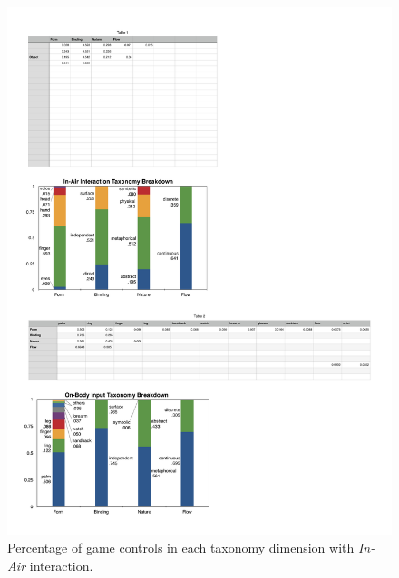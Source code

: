 \documentclass{sigchi}
\begin{document}
 \begin{figure}[!h]
  \centering
  \includegraphics[width=1\columnwidth]{InAirTaxonomy.pdf}
  \caption{Percentage of game controls in each taxonomy dimension with \emph{In-Air} interaction.}
  \label{fig:InAirTaxonomy}
  \end{figure} 
\end{document}
